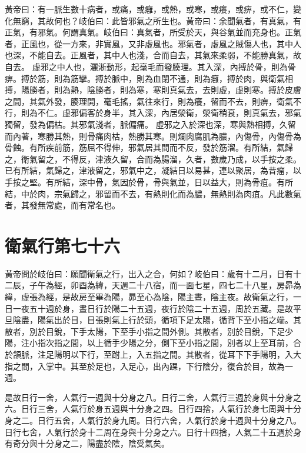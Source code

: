 黃帝曰：有一脈生數十病者，或痛，或癰，或熱，或寒，或癢，或痹，或不仁，變化無窮，其故何也？岐伯曰：此皆邪氣之所生也。黃帝曰：余聞氣者，有真氣，有正氣，有邪氣。何謂真氣。岐伯曰：真氣者，所受於天，與谷氣並而充身也。正氣者，正風也，從一方來，非實風，又非虛風也。邪氣者，虛風之賊傷人也，其中人也深，不能自去。正風者，其中人也淺，合而自去，其氣來柔弱，不能勝真氣，故自去。
虛邪之中人也，灑淅動形，起毫毛而發腠理。其入深，內搏於骨，則為骨痹。搏於筋，則為筋攣。搏於脈中，則為血閉不通，則為癰，搏於肉，與衛氣相搏，陽勝者，則為熱，陰勝者，則為寒，寒則真氣去，去則虛，虛則寒。搏於皮膚之間，其氣外發，腠理開，毫毛搖，氣往來行，則為癢，留而不去，則痹，衛氣不行，則為不仁。虛邪偏客於身半，其入深，內居滎衛，滎衛稍衰，則真氣去，邪氣獨留，發為偏枯。其邪氣淺者，脈偏痛。
虛邪之入於深也深，寒與熱相搏，久留而內著，寒勝其熱，則骨痛肉枯，熱勝其寒。則爛肉腐肌為膿，內傷骨，內傷骨為骨蝕。有所疾前筋，筋屈不得伸，邪氣居其間而不反，發於筋溜。有所結，氣歸之，衛氣留之，不得反，津液久留，合而為腸溜，久者，數歲乃成，以手按之柔。已有所結，氣歸之，津液留之，邪氣中之，凝結日以易甚，連以聚居，為昔瘤，以手按之堅。有所結，深中骨，氣因於骨，骨與氣並，日以益大，則為骨疽。有所結，中於肉，宗氣歸之，邪留而不去，有熱則化而為膿，無熱則為肉疽。凡此數氣者，其發無常處，而有常名也。



\section{衛氣行第七十六}

黃帝問於岐伯曰：願聞衛氣之行，出入之合，何如？岐伯曰：歲有十二月，日有十二辰，子午為經，卯酉為緯，天週二十八宿，而一面七星，四七二十八星，房昴為緯，虛張為經，是故房至畢為陽，昴至心為陰，陽主晝，陰主夜。故衛氣之行，一日一夜五十週於身，晝日行於陽二十五週，夜行於陰二十五週，周於五藏。是故平旦陰盡，陽氣出於目，目張則氣上行於頭，循項下足太陽，循背下至小指之端。其散者，別於目銳，下手太陽，下至手小指之間外側。其散者，別於目銳，下足少陽，注小指次指之間，以上循手少陽之分，側下至小指之間，別者以上至耳前，合於頷脈，注足陽明以下行，至跗上，入五指之間。其散者，從耳下下手陽明，入大指之間，入掌中。其至於足也，入足心，出內踝，下行陰分，復合於目，故為一週。

是故日行一舍，人氣行一週與十分身之八。日行二舍，人氣行三週於身與十分身之六。日行三舍，人氣行於身五週與十分身之四。日行四捨，人氣行於身七周與十分身之二。日行五舍，人氣行於身九周。日行六舍，人氣行於身十週與十分身之八。日行七舍，人氣行於身十二周在身與十分身之六。日行十四捨，人氣二十五週於身有奇分與十分身之二，陽盡於陰，陰受氣矣。

